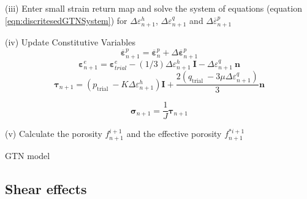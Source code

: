 \documentclass[sn-mathphys,Numbered,draft]{sn-jnl}%
\begin{document}
\begin{algorithm}[H]
(iii) Enter small strain return map and solve the system of equations (equation \ref{eqn:discritesedGTNSystem}) for $\Delta {\varepsilon}_{n+1}^h$, $\Delta {\varepsilon}_{n+1}^q$ and $\Delta \overline{{\varepsilon}}^p_{n+1}$


(iv) Update Constitutive Variables
\begin{equation}
\overline{\boldsymbol{\varepsilon}}^p_{n+1}=\overline{\boldsymbol{\varepsilon}}^p_{n}+\Delta \overline{\boldsymbol{\varepsilon}}^p_{n+1}\nonumber
\end{equation}
\begin{equation}
\boldsymbol{\varepsilon}^{e}_{n+1}=\boldsymbol{\varepsilon}^{e}_{trial}-(1/3)\Delta {\varepsilon}_{n+1}^h\ \mathbf{I}-\Delta {\varepsilon}_{n+1}^q\ \mathbf{n}\nonumber
\end{equation}
\begin{equation}
\boldsymbol{\tau}_{n+1}=(p_{\text {trial }}-K \Delta \varepsilon_{n+1}^h)\mathbf{I}+\frac{2(q_{\text {trial }}-3 \mu \Delta \varepsilon_{n+1}^q)}{3}\mathbf{n} \nonumber
\end{equation}

\begin{equation}
\boldsymbol{\sigma}_{n+1}=\frac{1}{J}\boldsymbol{\tau}_{n+1}\nonumber
\end{equation}

(v) Calculate the porosity $f^{i+1}_{n+1}$ and the effective porosity $f^{*i+1}_{n+1}$
\caption{GTN model}
\end{algorithm}

\subsection{Shear effects}
\end{document}
